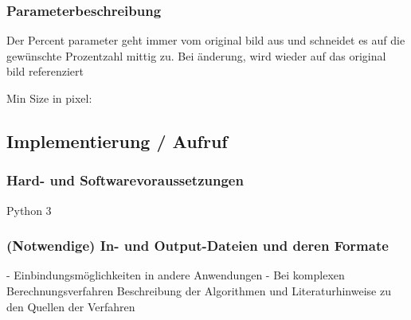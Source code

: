 \subsubsection{Parameterbeschreibung}
Der Percent parameter geht immer vom original bild aus und schneidet es auf die gewünschte Prozentzahl mittig zu. Bei änderung, wird wieder auf das original bild referenziert

Min Size in pixel: 

\subsection{Implementierung / Aufruf}    






\subsubsection{Hard- und Softwarevoraussetzungen}

Python 3 

\subsubsection{(Notwendige) In- und Output-Dateien und deren Formate}


- Einbindungsmöglichkeiten in andere Anwendungen
- Bei komplexen Berechnungsverfahren Beschreibung der Algorithmen und Literaturhinweise zu den Quellen der Verfahren


    
